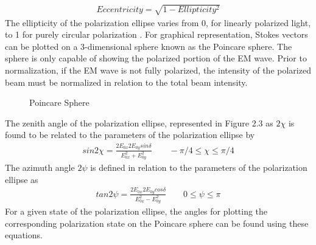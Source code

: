 \begin{align}
    Eccentricity= \sqrt{1-Ellipticity^2}
\end{align}
%
The ellipticity of the polarization ellipse varies from 0, for linearly polarized light, to 1 for purely circular polarization \cite{chipman}.
%
For	graphical representation, Stokes vectors can be plotted on a 3-dimensional sphere known as the Poincare sphere. The sphere is only capable of showing the polarized portion of the EM wave.  Prior to normalization, if the EM wave is not fully polarized, the intensity of the polarized beam must be normalized in relation to the total beam intensity.
%
\begin{figure}[!htb]
    \begin{center}
    \end{center}
    \caption{Poincare Sphere}
    \label{fig:polarization}
\end{figure}
%
The zenith angle of the polarization ellipse, represented in Figure 2.3 as $2\chi$ is found to be related to the parameters of the polarization ellipse by
%
\begin{align}
    sin2\chi = \frac{2E_{0x}2E_{0y}sin\delta}{E_{0x}^2+E_{0y}^2}\qquad -\pi / 4 \leq \chi \leq \pi / 4
\end{align}
%
The azimuth angle $2\psi$ is defined in relation to the parameters of the polarization ellipse as
%
\begin{align}
    tan2\psi = \frac{2E_{0x}2E_{0y}cos\delta}{E_{0x}^2-E_{0y}^2}\qquad 0 \leq \psi \leq \pi
\end{align}
%
For a given state of the polarization ellipse, the angles for plotting the corresponding polarization state on the Poincare sphere can be found using these equations\cite{spieellipse}.
